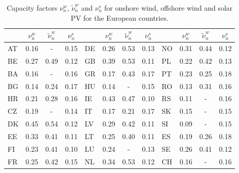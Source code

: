 \begin{table*}[p]
\caption{Capacity factors $\nu_n^w$, $\tilde{\nu}_n^w$ and  $\nu_n^s$ for onshore wind, offshore wind and solar PV for the European countries.}
\label{tab:capacity-factors}
\begin{adjustbox}{center}
\begin{tabular}{lccclccclccc}  \toprule
 & $\nu_n^w$ & $\tilde{\nu}_n^w$ & $\nu_n^s$ &  & $\nu_n^w$ & $\tilde{\nu}_n^w$ & $\nu_n^s$ &  & $\nu_n^w$ & $\tilde{\nu}_n^w$ & $\nu_n^s$\\ \midrule
AT & 0.16 & - & 0.15 & DE & 0.26 & 0.53 & 0.13 & NO & 0.31 & 0.44 & 0.12\\
BE & 0.27 & 0.49 & 0.12 & GB & 0.39 & 0.53 & 0.11 & PL & 0.22 & 0.42 & 0.13\\
BA & 0.16 & - & 0.16 & GR & 0.17 & 0.43 & 0.17 & PT & 0.23 & 0.25 & 0.18\\
BG & 0.14 & 0.24 & 0.17 & HU & 0.14 & - & 0.15 & RO & 0.13 & 0.31 & 0.16\\
HR & 0.21 & 0.28 & 0.16 & IE & 0.43 & 0.47 & 0.10 & RS & 0.11 & - & 0.16\\
CZ & 0.19 & - & 0.14 & IT & 0.17 & 0.21 & 0.17 & SK & 0.15 & - & 0.15\\
DK & 0.45 & 0.54 & 0.12 & LV & 0.29 & 0.42 & 0.11 & SI & 0.09 & - & 0.15\\
EE & 0.33 & 0.41 & 0.11 & LT & 0.25 & 0.40 & 0.11 & ES & 0.19 & 0.26 & 0.18\\
FI & 0.23 & 0.41 & 0.10 & LU & 0.24 & - & 0.13 & SE & 0.26 & 0.41 & 0.12\\
FR & 0.25 & 0.42 & 0.15 & NL & 0.34 & 0.53 & 0.12 & CH & 0.16 & - & 0.16\\ \bottomrule
\end{tabular}
\end{adjustbox}
\end{table*}
